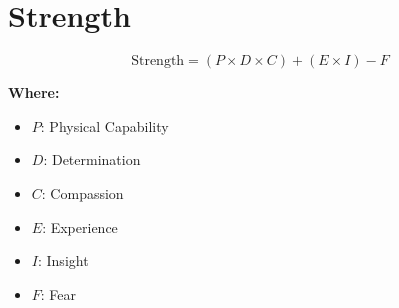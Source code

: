 \chapter{Strength}

\begin{equation}
\text{Strength} = (P \times D \times C) + (E \times I) - F
\end{equation}

\textbf{Where:}

\begin{itemize}
    \item $P$: Physical Capability
    \item $D$: Determination
    \item $C$: Compassion
    \item $E$: Experience
    \item $I$: Insight
    \item $F$: Fear
\end{itemize}